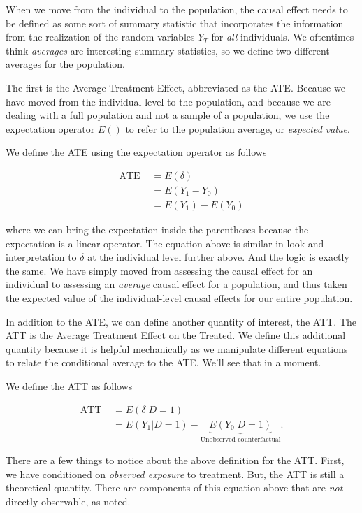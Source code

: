 \documentclass[11pt]{article}
\begin{document}
When we move from the individual to the population, the causal effect needs to be defined as some sort of summary statistic that incorporates the information from the realization of the random variables $Y_{T}$ for \emph{all} individuals.  We oftentimes think \emph{averages} are interesting summary statistics, so we define two different averages for the population.

The first is the Average Treatment Effect, abbreviated as the ATE.  Because we have moved from the individual level to the population, and because we are dealing with a full population and not a sample of a population, we use the expectation operator $E()$ to refer to the population average, or \emph{expected value}.

We define the ATE using the expectation operator as follows

\begin{align*}
  \text{ATE } &= E(\delta) \\
        &= E(Y_{1} - Y_{0}) \\
        &= E(Y_{1}) - E(Y_{0})
\end{align*}

where we can bring the expectation inside the parentheses because the expectation is a linear operator.  The equation above is similar in look and interpretation to $\delta$ at the individual level further above.  And the logic is exactly the same.  We have simply moved from assessing the causal effect for an individual to assessing an \emph{average} causal effect for a population, and thus taken the expected value of the individual-level causal effects for our entire population.

In addition to the ATE, we can define another quantity of interest, the ATT.  The ATT is the Average Treatment Effect on the Treated.  We define this additional quantity because it is helpful mechanically as we manipulate different equations to relate the conditional average to the ATE.  We'll see that in a moment.

We define the ATT as follows

\begin{align*}
  \text{ATT } &= E(\delta|D=1) \\
          &= E(Y_{1}|D=1) - \underbrace{E(Y_{0}|D=1)}_\text{Unobserved counterfactual} .
\end{align*}

There are a few things to notice about the above definition for the ATT.  First, we have conditioned on \emph{observed exposure} to treatment.  But, the ATT is still a theoretical quantity.  There are components of this equation above that are \emph{not} directly observable, as noted.
\end{document}
